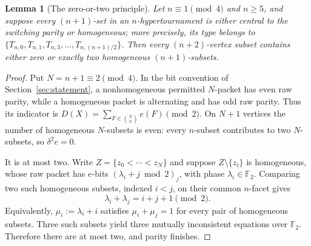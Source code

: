 \documentclass[11pt,a4paper]{article}
\newtheorem{lemma}[theorem]{Lemma}
\theoremstyle{remark}
\newcommand{\F}{\mathbb F_2}
\begin{document}
\begin{lemma}[The zero-or-two principle]\label{lem:zero-two}
Let $n\equiv1\pmod4$ and $n\ge5$, and suppose every $(n+1)$-set
in an $n$-hypertournament is either central to the switching parity
or homogeneous; more precisely, its type belongs to
$\{T_{n,0},T_{n,1},T_{n,3},\ldots,T_{n,(n+1)/2}\}$.
Then every $(n+2)$-vertex subset contains either zero or exactly two
homogeneous $(n+1)$-subsets.
\end{lemma}
\begin{proof}
Put $N=n+1\equiv2\pmod4$.  In the bit convention of
Section~\ref{sec:statement}, a nonhomogeneous permitted $N$-packet
has even raw parity, while a homogeneous packet is alternating and
has odd raw parity.  Thus its indicator is
$D(X)=\sum_{F\in\binom Xn}e(F)\pmod2$.
On $N+1$ vertices the number of homogeneous $N$-subsets is even:
every $n$-subset contributes to two $N$-subsets, so
$\delta^2e=0$.

It is at most two.  Write $Z=\{z_0<\cdots<z_N\}$ and suppose
$Z\setminus\{z_i\}$ is homogeneous, whose raw packet has $e$-bits $(\lambda_i+j\bmod2)_j$,
with phase $\lambda_i\in\F$. Comparing two such homogeneous subsets,
indexed $i<j$, on their common $n$-facet gives
\[
 \lambda_i+\lambda_j=i+j+1\pmod2.
\]
Equivalently, $\mu_i:=\lambda_i+i$ satisfies
$\mu_i+\mu_j=1$ for every pair of homogeneous subsets.
Three such subsets yield three mutually inconsistent equations over
$\F$.  Therefore there are at most two, and parity finishes.
\end{proof}
\end{document}
